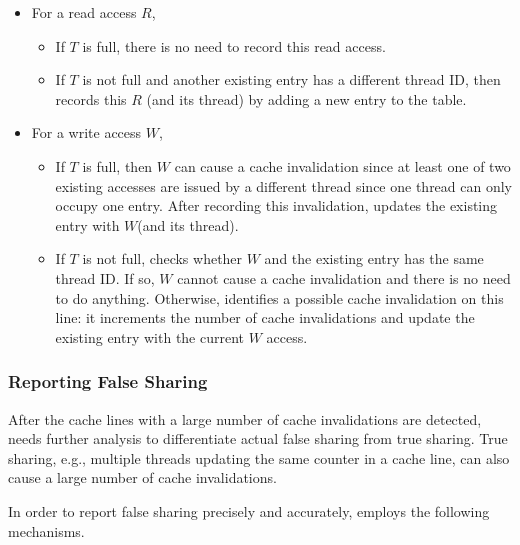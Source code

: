 \begin{itemize}
\item
  For a read access $R$, 
  \begin{itemize}
    \item
      If $T$ is full, there is no need to record this read access.
    \item
      If $T$ is not full and another existing entry has a different thread
      ID, then \Predator{} records this $R$ (and its thread) by adding a new entry to the table. 
  \end{itemize}
\item
  For a write access $W$, 
  \begin{itemize}
    \item
      If $T$ is full, then $W$ can cause a cache invalidation since at least one of two existing accesses are issued by a different thread since one thread can only occupy one entry.
      After recording this invalidation, \Predator{} updates the
      existing entry with $W$(and its thread).
    \item
      If $T$ is not full,
      \Predator{} checks whether $W$ and the existing entry has the same thread ID. If so, $W$ cannot cause a cache invalidation and there is no need to do anything. Otherwise, \Predator{} identifies a possible cache invalidation on this line: it increments the number of cache invalidations and update the existing entry with the current $W$ access.
  \end{itemize}
\end{itemize}

\subsubsection{Reporting False Sharing}

After the cache lines with a large number of cache invalidations are detected,
\Predator{} needs further analysis to differentiate actual false sharing from true sharing. 
True sharing, e.g., multiple threads updating the same counter in a cache line, can also cause a large number of cache invalidations.

In order to report false sharing precisely and accurately,  
\Predator{} employs the following mechanisms. 

